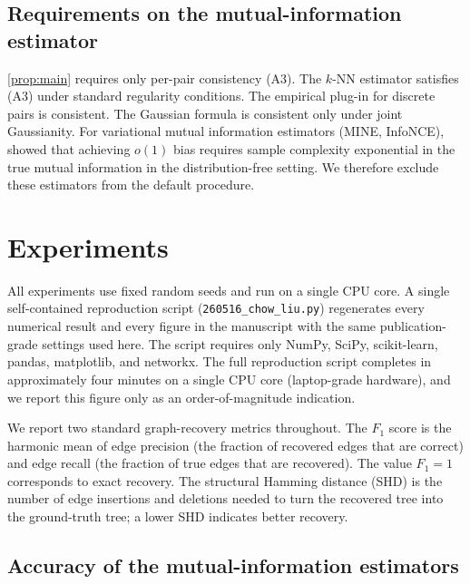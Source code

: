 \subsection{Requirements on the mutual-information estimator}
\label{subsec:requirements}

\cref{prop:main} requires only per-pair consistency (A3).
The $k$-NN estimator
\citep{kraskov2004estimating, gao2017estimating} satisfies (A3) under
standard regularity conditions. The empirical plug-in for discrete
pairs is consistent. The Gaussian formula is consistent only under
joint Gaussianity. For variational mutual information estimators
(MINE, InfoNCE), \citet{mcallester2020formal} showed that achieving
$o(1)$ bias requires sample complexity exponential in the true mutual
information in the distribution-free setting. We therefore exclude
these estimators from the default procedure.

\section{Experiments}
\label{sec:experiments}

All experiments use fixed random seeds and run on a single CPU core.
A single self-contained reproduction script
(\texttt{260516\_chow\_liu.py}) regenerates every numerical result and
every figure in the manuscript with the same publication-grade
settings used here. The script requires only NumPy, SciPy,
scikit-learn, pandas, matplotlib, and networkx. The full
reproduction script completes in approximately four minutes on a
single CPU core (laptop-grade hardware), and we report this figure
only as an order-of-magnitude indication.

We report two standard graph-recovery metrics throughout. The $F_1$
score is the harmonic mean of edge precision (the fraction of
recovered edges that are correct) and edge recall (the fraction of
true edges that are recovered). The value $F_1 = 1$ corresponds to
exact recovery. The structural Hamming distance (SHD) is the number
of edge insertions and deletions needed to turn the recovered tree
into the ground-truth tree; a lower SHD indicates better recovery.

\subsection{Accuracy of the mutual-information estimators}
\label{subsec:miacc}

